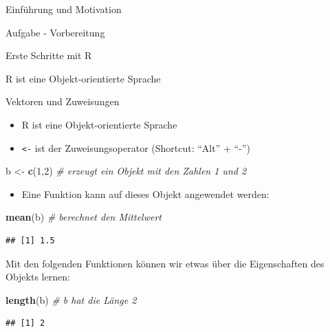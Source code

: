 \documentclass[ignorenonframetext,]{beamer}
\newenvironment{Shaded}{}{}
\newcommand{\KeywordTok}[1]{\textcolor[rgb]{0.00,0.44,0.13}{\textbf{{#1}}}}
\newcommand{\DecValTok}[1]{\textcolor[rgb]{0.25,0.63,0.44}{{#1}}}
\newcommand{\StringTok}[1]{\textcolor[rgb]{0.25,0.44,0.63}{{#1}}}
\newcommand{\CommentTok}[1]{\textcolor[rgb]{0.38,0.63,0.69}{\textit{{#1}}}}
\newcommand{\NormalTok}[1]{{#1}}
\providecommand{\tightlist}{%
\setlength{\itemsep}{0pt}\setlength{\parskip}{0pt}}
\begin{document}
\begin{frame}[fragile]{Einführung und Motivation}
\begin{block}{Aufgabe - Vorbereitung}
\end{block}

\end{frame}

\begin{frame}[fragile]{Erste Schritte mit R}

\begin{block}{R ist eine Objekt-orientierte Sprache}

Vektoren und Zuweisungen

\begin{itemize}
\tightlist
\item
  R ist eine Objekt-orientierte Sprache
\item
  \texttt{\textless{}-} ist der Zuweisungsoperator (Shortcut: ``Alt'' +
  ``-'')
\end{itemize}

\begin{Shaded}
\begin{Highlighting}[]
\NormalTok{b <-}\StringTok{ }\KeywordTok{c}\NormalTok{(}\DecValTok{1}\NormalTok{,}\DecValTok{2}\NormalTok{) }\CommentTok{# erzeugt ein Objekt mit den Zahlen 1 und 2}
\end{Highlighting}
\end{Shaded}

\begin{itemize}
\tightlist
\item
  Eine Funktion kann auf dieses Objekt angewendet werden:
\end{itemize}

\begin{Shaded}
\begin{Highlighting}[]
\KeywordTok{mean}\NormalTok{(b) }\CommentTok{# berechnet den Mittelwert}
\end{Highlighting}
\end{Shaded}

\begin{verbatim}
## [1] 1.5
\end{verbatim}

Mit den folgenden Funktionen können wir etwas über die Eigenschaften des
Objekts lernen:

\begin{Shaded}
\begin{Highlighting}[]
\KeywordTok{length}\NormalTok{(b) }\CommentTok{# b hat die Länge 2}
\end{Highlighting}
\end{Shaded}

\begin{verbatim}
## [1] 2
\end{verbatim}


\end{block}
\end{frame}
\end{document}
